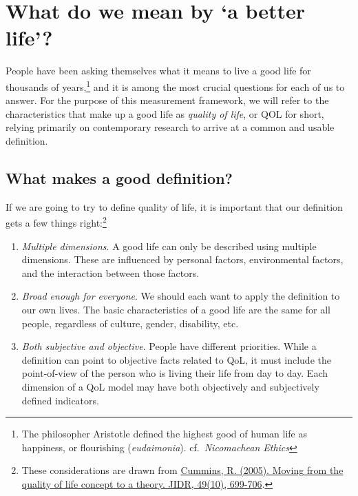\documentclass[
]{book}
\providecommand{\tightlist}{%
  \setlength{\itemsep}{0pt}\setlength{\parskip}{0pt}}
\begin{document}
\hypertarget{qol_def}{%
\section{What do we mean by `a better life'?}\label{qol_def}}

People have been asking themselves what it means to live a good life for thousands of years,\footnote{The philosopher Aristotle defined the highest good of human life as happiness, or flourishing (\emph{eudaimonia}). cf.~\emph{Nicomachean Ethics}} and it is among the most crucial questions for each of us to answer. For the purpose of this measurement framework, we will refer to the characteristics that make up a good life as \emph{quality of life}, or QOL for short, relying primarily on contemporary research to arrive at a common and usable definition.

\hypertarget{what-makes-a-good-definition}{%
\subsection{What makes a good definition?}\label{what-makes-a-good-definition}}

If we are going to try to define quality of life, it is important that our definition gets a few things right:\footnote{These considerations are drawn from \href{https://www.ncbi.nlm.nih.gov/pubmed/16162114}{Cummins, R. (2005). Moving from the quality of life concept to a theory. JIDR, 49(10), 699-706}.}

\begin{enumerate}
\def\labelenumi{\arabic{enumi}.}
\tightlist
\item
  \emph{Multiple dimensions}. A good life can only be described using multiple dimensions. These are influenced by personal factors, environmental factors, and the interaction between those factors.
\item
  \emph{Broad enough for everyone}. We should each want to apply the definition to our own lives. The basic characteristics of a good life are the same for all people, regardless of culture, gender, disability, etc.
\item
  \emph{Both subjective and objective}. People have different priorities. While a definition can point to objective facts related to QoL, it must include the point-of-view of the person who is living their life from day to day. Each dimension of a QoL model may have both objectively and subjectively defined indicators.
\end{enumerate}
\end{document}
